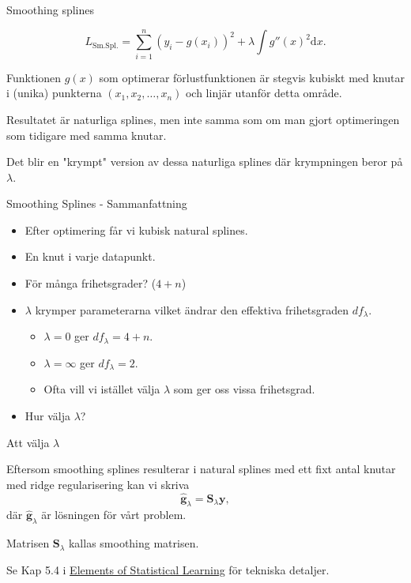 \documentclass[10pt,english]{beamer}
\begin{document}
\begin{frame}{Smoothing splines}

    \begin{equation*}
        L_{\text{Sm.Spl.}} = \sum_{i=1}^{n}(y_i - g(x_i))^2 + \lambda \int g''(x)^2 \mathrm{d}x.
    \end{equation*}

    \begin{bluebox}
        Funktionen $g(x)$ som optimerar förlustfunktionen är stegvis kubiskt med knutar i (unika) punkterna $(x_1, x_2, \ldots, x_n)$ och linjär utanför detta område.
    \end{bluebox}

    Resultatet är naturliga splines, men inte samma som om man gjort optimeringen som tidigare med samma knutar.

    Det blir en "krympt" version av dessa naturliga splines där krympningen beror på $\lambda$.
    
\end{frame}

\begin{frame}{Smoothing Splines - Sammanfattning}

    \begin{itemize}
        \item Efter optimering får vi kubisk natural splines.
        \item En knut i varje datapunkt.
        \item För många frihetsgrader? ($4+n$)
        \item $\lambda$ krymper parameterarna vilket ändrar den effektiva frihetsgraden $df_{\lambda}$.
        \begin{itemize}
            \item $\lambda = 0$ ger $df_{\lambda} = 4+n$.
            \item $\lambda = \infty$ ger $df_{\lambda} = 2$.
            \item Ofta vill vi istället välja $\lambda$ som ger oss vissa frihetsgrad.
        \end{itemize}
        \item Hur välja $\lambda$?
    \end{itemize}
    
\end{frame}

\begin{frame}{Att välja $\lambda$}
    
    Eftersom smoothing splines resulterar i natural splines med ett fixt antal knutar med ridge regularisering kan vi skriva
    \begin{equation*}
        \hat{\mathbf{g}}_{\lambda} = \mathbf{S}_{\lambda} \mathbf{y},
    \end{equation*}
    där $\hat{\mathbf{g}}_{\lambda}$ är lösningen för vårt problem.

    Matrisen $\mathbf{S}_{\lambda}$ kallas smoothing matrisen.

    Se Kap 5.4 i \href{https://hastie.su.domains/ElemStatLearn/}{Elements of Statistical Learning} för tekniska detaljer.

\end{frame}
\end{document}
